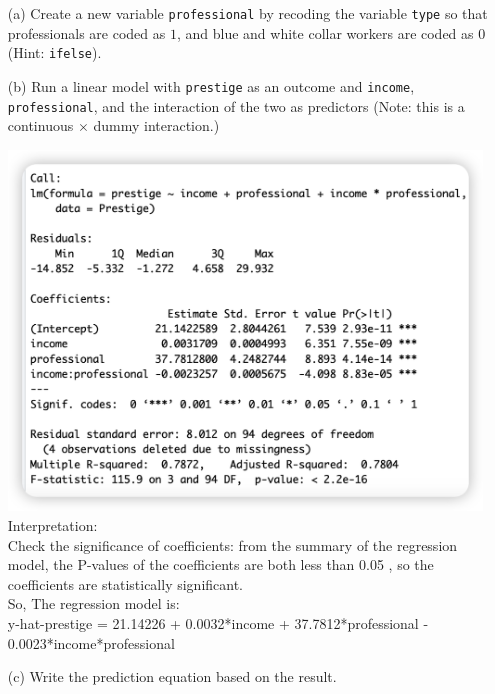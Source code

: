 \documentclass[12pt,letterpaper]{article}
\begin{document}
\newpage
\begin{enumerate}
	
	\item [(a)]
	Create a new variable \texttt{professional} by recoding the variable \texttt{type} so that professionals are coded as $1$, and blue and white collar workers are coded as $0$ (Hint: \texttt{ifelse}).
	
	\vspace{1cm}
	
	
	
	
	\item [(b)]
	Run a linear model with \texttt{prestige} as an outcome and \texttt{income}, \texttt{professional}, and the interaction of the two as predictors (Note: this is a continuous $\times$ dummy interaction.)
	
	\vspace{1cm}
	
	\includegraphics[width=0.99\textwidth]{1-2.png}
	\noindent
	Interpretation:\\
	Check the significance of coefficients: from the summary of the regression model, the P-values of the coefficients are both less than 0.05 , so the coefficients are statistically significant.\\
	
	So, The regression model is: \\
	y-hat-prestige = 21.14226 + 0.0032*income + 37.7812*professional - 0.0023*income*professional
	\item [(c)]
	Write the prediction equation based on the result.\\
	\noindent
	

\end{enumerate}
\end{document}
